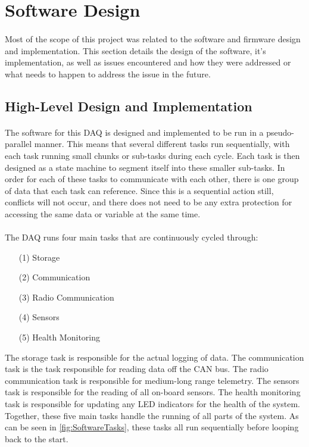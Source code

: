 \section{Software Design}

\paragraph{}
Most of the scope of this project was related to the software and firmware design and implementation.
This section details the design of the software, it's implementation, as well as issues encountered and how they were addressed or what needs to happen to address the issue in the future.

\subsection{High-Level Design and Implementation}

\paragraph{}
The software for this DAQ is designed and implemented to be run in a pseudo-parallel manner.
This means that several different tasks run sequentially, with each task running small chunks or sub-tasks during each cycle.
Each task is then designed as a state machine to segment itself into these smaller sub-tasks.
In order for each of these tasks to communicate with each other, there is one group of data that each task can reference.
Since this is a sequential action still, conflicts will not occur, and there does not need to be any extra protection for accessing the same data or variable at the same time.

\paragraph{}
The DAQ runs four main tasks that are continuously cycled through:
\begin{itemize}
	\item[(1)] Storage
	\item[(2)] Communication
	\item[(3)] Radio Communication
	\item[(4)] Sensors
	\item[(5)] Health Monitoring
\end{itemize}
The storage task is responsible for the actual logging of data.
The communication task is the task responsible for reading data off the CAN bus.
The radio communication task is responsible for medium-long range telemetry.
The sensors task is responsible for the reading of all on-board sensors.
The health monitoring task is responsible for updating any LED indicators for the health of the system.
Together, these five main tasks handle the running of all parts of the system.
As can be seen in \cref{fig:SoftwareTasks}, these tasks all run sequentially before looping back to the start.

